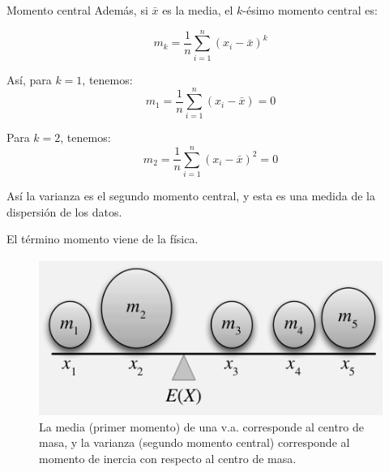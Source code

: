 \documentclass{beamer}
\begin{document}
\begin{frame}{Momento central}
  Además, si $\bar{x}$ es la media, el $k$-ésimo momento central es:

  \begin{equation}
    m_{k} = \frac{1}{n} \sum_{i=1}^{n} (x_{i} - \bar{x})^k
  \end{equation}

  Así, para $k=1$, tenemos:
  \begin{equation}
    m_{1} = \frac{1}{n} \sum_{i=1}^{n} (x_{i} - \bar{x}) = 0
  \end{equation}
  
    Para $k=2$, tenemos:
  \begin{equation}
    m_{2} = \frac{1}{n} \sum_{i=1}^{n} (x_{i} - \bar{x})^2 = 0
  \end{equation}

  Así la varianza es el segundo momento central, y esta es una medida de la
  dispersión de los datos.

%

\end{frame}

\begin{frame}{}
  El término momento viene de la física. 

  \begin{figure}[h!]
    \centering
    \includegraphics[scale=0.5]{figures/physics_moment.png}
    \caption{La media (primer momento) de una v.a. corresponde al centro de masa, y la varianza (segundo momento central) corresponde al momento de inercia con respecto al centro de masa.}
  \end{figure}

\end{frame}
\end{document}
